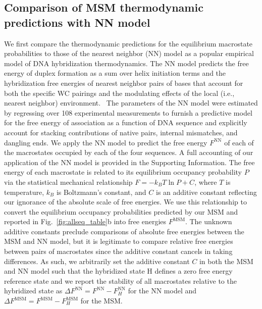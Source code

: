 \documentclass[journal=jpcbfk,manuscript=article]{achemso}
\newcommand*{\blauw}[1]{{#1}}
\begin{document}
\subsection{Comparison of MSM thermodynamic predictions with NN model} \label{sec:NN}

We first compare the thermodynamic predictions for the equilibrium macrostate probabilities to those of the nearest neighbor (NN) model as a popular empirical model of DNA hybridization thermodynamics. The NN model predicts the free energy of duplex formation as a sum over helix initiation terms and the hybridization free energies of nearest neighbor pairs of bases that account for both the specific WC pairings and the modulating effects of the local (i.e., nearest neighbor) environment.~\citep{SantaLucia1998AThermodynamics, Santalucia2004TheMotifs} The parameters of the NN model were estimated by regressing over 108 experimental measurements to furnish a predictive model for the free energy of association as a function of DNA sequence and explicitly account for stacking contributions of native pairs, internal mismatches, and dangling ends. We apply the NN model to predict the free energy $F^\mathrm{NN}$ of each of the macrostates occupied by each of the four sequences. A full accounting of our application of the NN model is provided in the \blauw{Supporting Information}. The free energy of each macrostate is related to its equilibrium occupancy probability $P$ via the statistical mechanical relationship $F = -k_B T \ln P + C$, where $T$ is temperature, $k_B$ is Boltzmann's constant, and $C$ is an additive constant reflecting our ignorance of the absolute scale of free energies. We use this relationship to convert the equilibrium occupancy probabilities predicted by our MSM and reported in Fig.~\ref{fig:allseq_table}b into free energies $F^\mathrm{MSM}$. The unknown additive constants preclude comparisons of absolute free energies between the MSM and NN model, but it is legitimate to compare relative free energies between pairs of macrostates since the additive constant cancels in taking differences. As such, we arbitrarily set the additive constant $C$ in both the MSM and NN model such that the hybridized state H defines a zero free energy reference state and we report the stability of all macrostates relative to the hybridized state as $\Delta F^\mathrm{NN} = F^\mathrm{NN} - F_H^\mathrm{NN}$ for the NN model and $\Delta F^\mathrm{MSM} = F^\mathrm{MSM} - F_H^\mathrm{MSM}$ for the MSM. 
\end{document}
